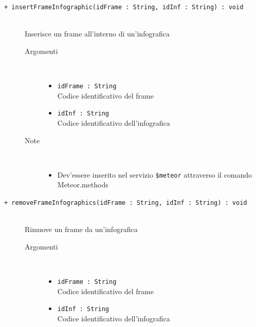 \begin{description}
	\begin{description}
		\item[\texttt{+ insertFrameInfographic(idFrame : String, idInf : String) : void			}] \hfill \\
			Inserisce un frame all'interno di un'infografica
			
		\begin{description}
			\item[Argomenti] \hfill \\
				\begin{itemize}
				
					\item \texttt{idFrame : String			} \hfill \\
					Codice identificativo del frame
					\item \texttt{idInf : String			} \hfill \\
					Codice identificativo dell'infografica
					
				\end{itemize}
			\item[Note] \hfill \\
			\begin{itemize}
					\item Dev'essere inserito nel servizio \texttt{\$meteor} attraverso il comando Meteor.methods
				\end{itemize}
		\end{description}
	\end{description}
	
	\begin{description}
		\item[\texttt{+ removeFrameInfographics(idFrame : String, idInf : String) : void			}] \hfill \\
			Rimuove un frame da un'infografica
			
		\begin{description}
			\item[Argomenti] \hfill \\
				\begin{itemize}
				
					\item \texttt{idFrame : String			} \hfill \\
					Codice identificativo del frame
					\item \texttt{idInf : String			} \hfill \\
					Codice identificativo dell'infografica
					

\end{itemize}
\end{description}
\end{description}
\end{description}
